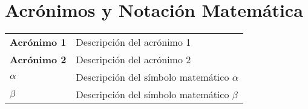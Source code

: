 \chapter*{Acrónimos y Notación Matemática}

\begin{SingleSpace}
\begingroup
\setlength{\tabcolsep}{0.5cm}
\begin{table}[h!]
    \begin{tabular}{ll}
         \textsf{\textbf{Acrónimo 1}} & Descripción del acrónimo 1\\
         \textsf{\textbf{Acrónimo 2}} & Descripción del acrónimo 2\\
         $\alpha$  & Descripción del símbolo matemático $\alpha$\\ 
         $\beta$   & Descripción del símbolo matemático $\beta$
    \end{tabular}
\end{table}
\endgroup
\end{SingleSpace}